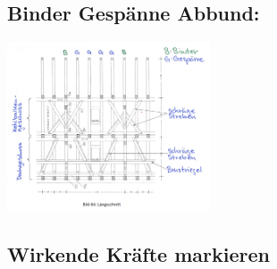 \documentclass[fleqn,twoside]{article}
\begin{document}
    \subsection{Binder Gespänne Abbund:}
            \includegraphics[width=0.45\textwidth]{Grafiken/Daecher/Binder Gespaenne Abbund.png}

    \subsection{Wirkende Kräfte markieren}
    
\end{document}
